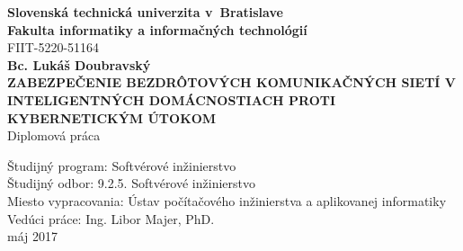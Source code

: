 \documentclass[12pt,a4paper,oneside,openright]{report}
\begin{document}
	\sloppy
\titleformat{\chapter}[hang]{\bf\huge}{\thechapter}{2pc}{}
\setcounter{tocdepth}{3}
\begin{titlepage}
	\begin{center}
	\large \textbf{Slovenská technická univerzita v~Bratislave \\
	Fakulta informatiky a informačných technológií} \\
	\vspace{0.8cm}	
	\normalsize FIIT-5220-51164 \\
	\vspace{6cm}
	\Large \textbf{Bc. Lukáš Doubravský} \\
	\vspace{0.5cm}
	\textbf{ZABEZPEČENIE BEZDRÔTOVÝCH KOMUNIKAČNÝCH SIETÍ V INTELIGENTNÝCH DOMÁCNOSTIACH PROTI KYBERNETICKÝM ÚTOKOM} \\
	\vspace{0.5cm}
    Diplomová práca
	\end{center}
	\vspace{4.5cm}	
	\begin{flushleft}
	\begin{onehalfspacing}
		Študijný program: \tabto{4.2cm}Softvérové inžinierstvo \\
		Študijný odbor: \tabto{4.2cm}9.2.5. Softvérové inžinierstvo \\
		Miesto vypracovania: \tabto{4.2cm}Ústav počítačového inžinierstva a aplikovanej informatiky  \\
		Vedúci práce: \tabto{4.2cm}Ing. Libor Majer, PhD. \\
		\vspace{0.5cm}
		máj 2017  
	\end{onehalfspacing}	
	\end{flushleft}
\end{titlepage}

\newpage
\thispagestyle{empty}
\mbox{}

\newpage
\thispagestyle{empty}
\vspace*{18cm}
\end{document}
